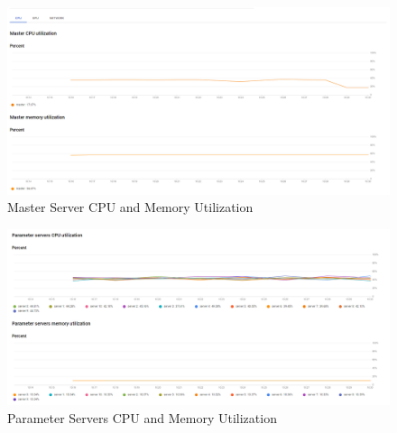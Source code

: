\begin{Schunk}
\begin{figure}[H]

{\centering \includegraphics[width=1\linewidth]{../images/job_master_cpu} 

}

\caption[Master Server CPU and Memory Utilization]{Master Server CPU and Memory Utilization}\label{fig:master}
\end{figure}
\end{Schunk}

\begin{Schunk}
\begin{figure}[H]

{\centering \includegraphics[width=1\linewidth]{../images/job_parameter_server_cpu} 

}

\caption[Parameter Servers CPU and Memory Utilization]{Parameter Servers CPU and Memory Utilization}\label{fig:param}
\end{figure}
\end{Schunk}

